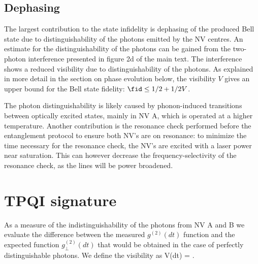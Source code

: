 \subsection{Dephasing}
The largest contribution to the state infidelity is dephasing of the produced Bell state due to distinguishability of the photons emitted by the NV centres. An estimate for the distinguishability of the photons can be gained from the two-photon interference presented in figure 2d of the main text. The interference shows a reduced visibility due to distinguishability of the photons. As explained in more detail in the section on phase evolution below, the visibility $V$ gives an upper bound for the Bell state fidelity:
$\fid\leq 1/2 + 1/2 V$.

The photon distinguishability is likely caused by phonon-induced transitions between optically excited states, mainly in NV A, which is operated at a higher temperature. Another contribution is the resonance check performed before the entanglement protocol to ensure both NV's are on resonance: to minimize the time necessary for the resonance check, the NV's are excited with a laser power near saturation. This can however decrease the frequency-selectivity of the resonance check, as the lines will be power broadened.

\section{TPQI signature}

As a measure of the indistinguishability of the photons from NV A and B we evaluate the difference between the measured $g^{(2)}(dt)$ function and the expected function $g^{(2)}_\perp(dt)$ that would be obtained in the case of perfectly distinguishable photons. We define the visibility as
\be
	\label{eqn:tpqi_visibility}
	V(dt) = .
\ee

